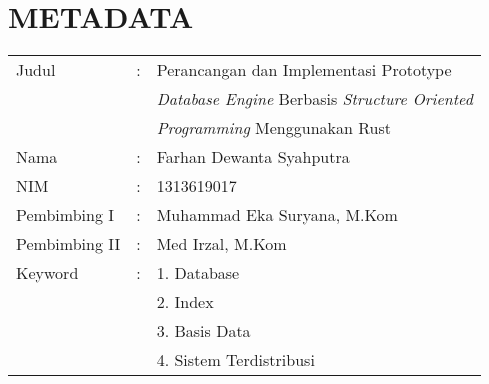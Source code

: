 \pagestyle{empty}
\chapter*{\centering \large METADATA}
\thispagestyle{empty}
\onehalfspacing{}

\vspace{2cm}
\noindent
\begin{tabular}{lcl}
	Judul	& :&  Perancangan dan Implementasi Prototype \\
	& & \emph{Database Engine} Berbasis \emph{Structure Oriented} \\
	& & \emph{Programming} Menggunakan Rust \\
	Nama	& :&  Farhan Dewanta Syahputra \\
	NIM	& :&  1313619017 \\
	Pembimbing I	& :&  Muhammad Eka Suryana, M.Kom \\
	Pembimbing II	& :&  Med Irzal, M.Kom \\
	Keyword	& :& 1. Database \\
	& & 2. Index \\
	& & 3. Basis Data \\
	& & 4. Sistem Terdistribusi
\end{tabular}
\vspace{0.5cm}
